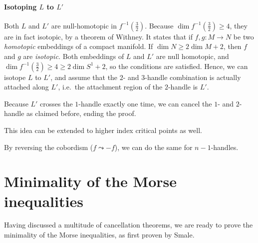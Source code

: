 \begin{myproof}
    \paragraph{Isotoping $L$ to $L'$}
    Both $L$ and $L'$ are null-homotopic in  $f^{-1}(\frac{3}{2})$.
    Because $\dim f^{-1}(\frac{3}{2}) \ge 4$, they are in fact isotopic, by a theorem of Withney.
    It states that if $f, g: M \to N$ be two \emph{homotopic} embeddings of a compact manifold. If $\dim N \ge  2 \dim M + 2$, then $f$ and  $g$ are \emph{isotopic.}
    Both embeddings of $L$ and  $L'$ are null homotopic, and  $\dim f^{-1}(\frac{3}{2}) \ge 4 \ge  2 \dim S^{1} +  2$, so the conditions are satisfied.
    Hence, we can isotope $L$ to $L'$, and assume that the $2$- and  $3$-handle combination is actually attached along $L'$, i.e.\ the attachment region of the $2$-handle is $L'$.

    Because $L'$ crosses the  $1$-handle exactly one time, we can cancel the $1$- and $2$-handle as claimed before, ending the proof.
\end{myproof}
\begin{remark}
    This idea can be extended to higher index critical points as well.
\end{remark}
\begin{remark}
    By reversing the cobordism ($f \leadsto -f$), we can do the same for $n-1$-handles.
\end{remark}

\section{Minimality of the Morse inequalities}
\label{sec:minimality}

Having discussed a multitude of cancellation theorems, we are ready to prove the minimality of the Morse inequalities, as first proven by Smale.

